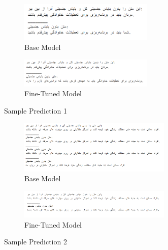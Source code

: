 \documentclass{solutionclass} %
\begin{document}
\begin{figure}[H]
	\centering
	\begin{subfigure}[t]{0.7\textwidth}
		\centering
		\includegraphics[width=0.7\textwidth]{img/3/s1b.png}
		\caption{Base Model}
	\end{subfigure}%

	\bigskip
	
	\begin{subfigure}[t]{0.7\textwidth}
		\centering
		\includegraphics[width=0.7\textwidth]{img/3/s1f.png}
		\caption{Fine-Tuned Model}
	\end{subfigure}
	\caption{Sample Prediction 1}
\end{figure}


\begin{figure}[H]
	\centering
\begin{subfigure}[t]{0.8\textwidth}
	\centering
	\includegraphics[width=0.8\textwidth]{img/3/s2b.png}
	\caption{Base Model}
\end{subfigure}%

\bigskip

\begin{subfigure}[t]{0.8\textwidth}
	\centering
	\includegraphics[width=0.8\textwidth]{img/3/s2f.png}
	\caption{Fine-Tuned Model}
\end{subfigure}
	\caption{Sample Prediction 2}
\end{figure}
\end{document}
